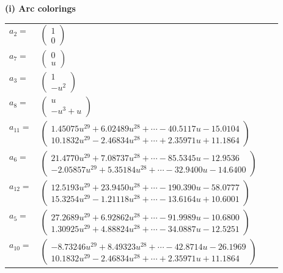 \documentclass[1p]{elsarticle_modified}
\theoremstyle{definition}
\begin{document}
\flushleft \textbf{(i) Arc colorings}\\
\begin{tabular}{m{7pt} m{180pt} m{7pt} m{180pt} }
\flushright $a_{2}=$&$\begin{pmatrix}1\\0\end{pmatrix}$ \\
\flushright $a_{7}=$&$\begin{pmatrix}0\\u\end{pmatrix}$ \\
\flushright $a_{3}=$&$\begin{pmatrix}1\\- u^2\end{pmatrix}$ \\
\flushright $a_{8}=$&$\begin{pmatrix}u\\- u^3+u\end{pmatrix}$ \\
\flushright $a_{11}=$&$\begin{pmatrix}1.45075 u^{29}+6.02489 u^{28}+\cdots-40.5117 u-15.0104\\10.1832 u^{29}-2.46834 u^{28}+\cdots+2.35971 u+11.1864\end{pmatrix}$ \\
\flushright $a_{6}=$&$\begin{pmatrix}21.4770 u^{29}+7.08737 u^{28}+\cdots-85.5345 u-12.9536\\-2.05857 u^{29}+5.35184 u^{28}+\cdots-32.9400 u-14.6400\end{pmatrix}$ \\
\flushright $a_{12}=$&$\begin{pmatrix}12.5193 u^{29}+23.9450 u^{28}+\cdots-190.390 u-58.0777\\15.3254 u^{29}-1.21118 u^{28}+\cdots-13.6164 u+10.6001\end{pmatrix}$ \\
\flushright $a_{5}=$&$\begin{pmatrix}27.2689 u^{29}+6.92862 u^{28}+\cdots-91.9989 u-10.6800\\1.30925 u^{29}+4.88824 u^{28}+\cdots-34.0887 u-12.5251\end{pmatrix}$ \\
\flushright $a_{10}=$&$\begin{pmatrix}-8.73246 u^{29}+8.49323 u^{28}+\cdots-42.8714 u-26.1969\\10.1832 u^{29}-2.46834 u^{28}+\cdots+2.35971 u+11.1864\end{pmatrix}$ \\

\end{tabular}
\end{document}
